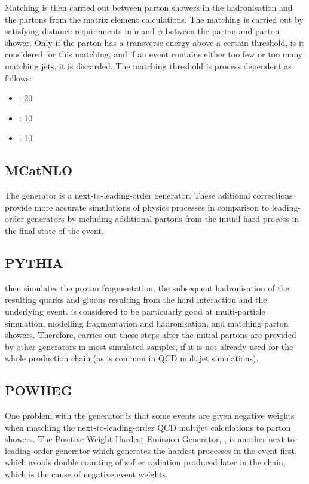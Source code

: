 Matching is then carried out between parton showers in the hadronisation and the partons from the matrix
element calculations. The matching is carried out by satisfying distance requirements in $\eta$ and $\phi$
between the parton and parton shower. Only if the parton has a transverse energy above a certain threshold, is
it considered for this matching, and if an event contains either too few or too many matching jets, it is
discarded. The matching threshold is process dependent as follows:
\begin{itemize}
  \item \ttbar: 20\GeV
  \item \WpJets: 10\GeV
  \item \ZpJets: 10\GeV
\end{itemize}

\subsection{MCatNLO}
\label{ss:mcatnlo}
The \MCATNLO \cite{mcatnlo_Frixione1, mcatnlo_Frixione2} generator is a next-to-leading-order generator. These
aditional corrections provide more accurate simulations of physics processes in comparison to leading-order
generators by including additional partons from the initial hard process in the final state of the event.

\subsection{PYTHIA}
\label{ss:pythia}
\PYTHIA \cite{pythia8} then simulates the proton fragmentation, the subsequent hadronisation of the
resulting quarks and gluons resulting from the hard interaction and the underlying event. \PYTHIA is
considered to be particuarly good at multi-particle simulation, modelling fragmentation and hadronisation, and
matching parton showers. Therefore, \PYTHIA carries out these steps after the initial partons are provided
by other generators in most simulated samples, if it is not already used for the whole production chain (as is
common in QCD multijet simulations).

\subsection{POWHEG}
\label{ss:powheg}
One problem with the \MCATNLO generator is that some events are given negative weights when matching
the next-to-leading-order QCD multijet calculations to parton showers.  The Positive Weight Hardest Emission
Generator, \POWHEG \cite{powheg_Frixione, powheg_Nason, powheg_Alioli}, is another next-to-leading-order
generator which generates the hardest processes in the event first, which avoids double counting of
softer radiation produced later in the chain, which is the cause of negative event weights.

